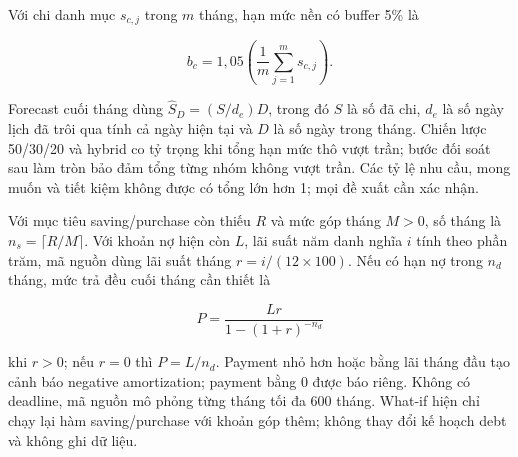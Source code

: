 Với chi danh mục $s_{c,j}$ trong $m$ tháng, hạn mức nền có buffer 5\% là

\begin{equation}
  b_c=1{,}05\left(\frac{1}{m}\sum_{j=1}^{m}s_{c,j}\right).
\end{equation}

Forecast cuối tháng dùng $\widehat S_D=(S/d_e)D$, trong đó $S$ là số đã chi, $d_e$ là số ngày lịch đã trôi qua tính cả ngày hiện tại và $D$ là số ngày trong tháng. Chiến lược 50/30/20 và hybrid co tỷ trọng khi tổng hạn mức thô vượt trần; bước đối soát sau làm tròn bảo đảm tổng từng nhóm không vượt trần. Các tỷ lệ nhu cầu, mong muốn và tiết kiệm không được có tổng lớn hơn 1; mọi đề xuất cần xác nhận.

Với mục tiêu saving/purchase còn thiếu $R$ và mức góp tháng $M>0$, số tháng là $n_s=\lceil R/M\rceil$. Với khoản nợ hiện còn $L$, lãi suất năm danh nghĩa $i$ tính theo phần trăm, mã nguồn dùng lãi suất tháng $r=i/(12\times100)$. Nếu có hạn nợ trong $n_d$ tháng, mức trả đều cuối tháng cần thiết là

\begin{equation}
  P=\frac{Lr}{1-(1+r)^{-n_d}}
\end{equation}

khi $r>0$; nếu $r=0$ thì $P=L/n_d$. Payment nhỏ hơn hoặc bằng lãi tháng đầu tạo cảnh báo negative amortization; payment bằng 0 được báo riêng. Không có deadline, mã nguồn mô phỏng từng tháng tối đa 600 tháng. What-if hiện chỉ chạy lại hàm saving/purchase với khoản góp thêm; không thay đổi kế hoạch debt và không ghi dữ liệu.



